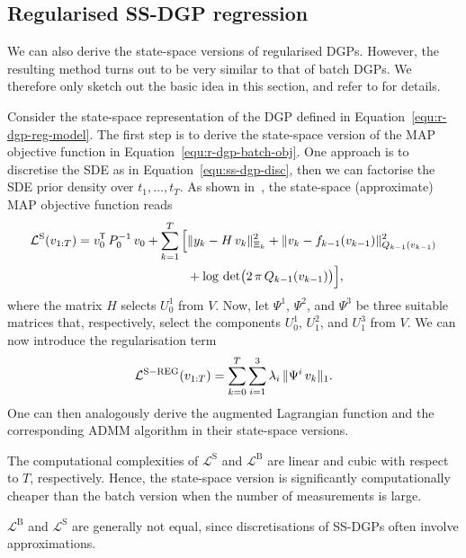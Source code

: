 \subsection*{Regularised SS-DGP regression}
We can also derive the state-space versions of regularised DGPs. However, the resulting method turns out to be very similar to that of batch DGPs. We therefore only sketch out the basic idea in this section, and refer to \citet{Zhao2021RSSGP} for details.

Consider the state-space representation of the DGP defined in Equation~\eqref{equ:r-dgp-reg-model}. The first step is to derive the state-space version of the MAP objective function in Equation~\eqref{equ:r-dgp-batch-obj}. One approach is to discretise the SDE as in Equation~\eqref{equ:ss-dgp-disc}, then we can factorise the SDE prior density over $t_1,\ldots, t_T$. As shown in~\citet{Zhao2021RSSGP}, the state-space (approximate) MAP objective function reads
%
\begin{equation}
	\begin{split}
		\mathcal{L}^\mathrm{S}(v_{1:T}) = v_0^{\mkern-1.5mu\mathsf{T}} \, P_0^{-1}\,v_0 + \sum^T_{k=1} \Big[ &\lVert y_k - H \, v_k\rVert^2_{\Xi_k} + \lVert v_k - f_{k-1}(v_{k-1})\rVert^2_{Q_{k-1}(v_{k-1})} \\
		&+ \log \, \det\bigl(2 \, \pi \, Q_{k-1}(v_{k-1})\bigr)\Big],
	\end{split}
\end{equation}
%
where the matrix $H$ selects $U^1_0$ from $V$. Now, let $\Psi^1$, $\Psi^2$, and $\Psi^3$ be three suitable matrices that, respectively, select the components $U^1_0$, $U^2_1$, and $U^3_1$ from $V$. We can now introduce the regularisation term
%
\begin{equation}
	\mathcal{L}^{\mathrm{S-REG}}(v_{1:T}) = \sum^T_{k=0} \sum^3_{i=1} \lambda_i \, \lVert\Psi^i \, v_k\rVert_1.
\end{equation}
%
One can then analogously derive the augmented Lagrangian function and the corresponding ADMM algorithm in their state-space versions.

\begin{remark}
	The computational complexities of $\mathcal{L}^\mathrm{S}$ and $\mathcal{L}^\mathrm{B}$ are linear and cubic with respect to $T$, respectively. Hence, the state-space version is significantly computationally cheaper than the batch version when the number of measurements is large. 
\end{remark}

\begin{remark}
	$\mathcal{L}^\mathrm{B}$ and $\mathcal{L}^\mathrm{S}$ are generally not equal, since discretisations of SS-DGPs often involve approximations.
\end{remark}


